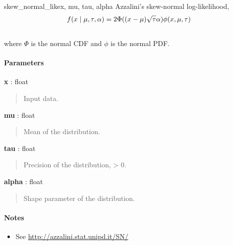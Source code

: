 \hypertarget{pymc.distributions.skew_normal_like}{}
\begin{funcdesc}{skew\_normal\_like}{x, mu, tau, alpha}
Azzalini's skew-normal log-likelihood,
\begin{gather}
\begin{split}f(x \mid \mu, \tau, \alpha) = 2 \Phi((x-\mu)\sqrt{\tau}\alpha) \phi(x,\mu,\tau)\end{split}\notag\\\begin{split}\end{split}\notag
\end{gather}
where $\Phi$ is the normal CDF and $\phi$ is the normal PDF.

\paragraph{Parameters}\begin{paramlist}

\item[] \textbf{x} : float
\begin{quote}

Input data.
\end{quote}

\item[] \textbf{mu} : float
\begin{quote}

Mean of the distribution.
\end{quote}

\item[] \textbf{tau} : float
\begin{quote}

Precision of the distribution, \textgreater{} 0.
\end{quote}

\item[] \textbf{alpha} : float
\begin{quote}

Shape parameter of the distribution.
\end{quote}
\end{paramlist}
\paragraph{Notes}
\begin{itemize}
\item {}
See \href{http://azzalini.stat.unipd.it/SN/}{http://azzalini.stat.unipd.it/SN/}

\end{itemize}
\end{funcdesc}

